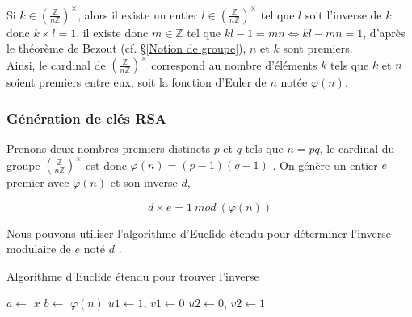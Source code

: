 Si $k \in (\frac{\mathbb{Z}}{n\mathbb{Z}})^{\times}$, alors il existe un entier $l \in (\frac{\mathbb{Z}}{n\mathbb{Z}})^{\times}$ tel que $l$ soit l'inverse de $k$ donc $k\times l = 1$, il existe donc $m \in \mathbb{Z}$ tel que $kl - 1 = mn \Leftrightarrow kl-mn=1$, d'après le théorème de Bezout (cf. §\ref{Notion de groupe}), $n$ et $k$ sont premiers.\\

Ainsi, le cardinal de $(\frac{\mathbb{Z}}{n\mathbb{Z}})^{\times}$ correspond au nombre d'éléments $k$ tels que $k$ et $n$ soient premiers entre eux, soit la fonction d'Euler de $n$ notée $\varphi(n)$.\cite{rostam_groupe_nodate}\\

\subsubsection{Génération de clés RSA} \label{Gen RSA key}
Prenons deux nombres premiers distincts $p$ et $q$ tels que $n=pq$, le cardinal du groupe $(\frac{\mathbb{Z}}{n\mathbb{Z}})^{\times}$ est donc $\varphi(n)=(p-1)(q-1)$ \cite{cormen_algorithmes_2013}. On génère un entier $e$ premier avec $\varphi(n)$ et son inverse $d$,

\[d\times e = 1 \: mod \: (\varphi(n))\]

Nous pouvons utiliser l'algorithme d'Euclide étendu pour déterminer l'inverse modulaire de $e$ noté $d$ \cite{cormen_algorithmes_2013}.

\begin{algorithm}[H]
\caption{Algorithme d'Euclide étendu pour trouver l'inverse}

$a \gets$  $x$\;
$b \gets$  $\varphi(n)$\;
$u1 \gets 1$, $v1 \gets 0$\;
$u2 \gets 0$, $v2 \gets 1$\;



\end{algorithm}

